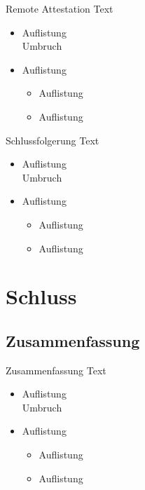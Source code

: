 \documentclass{sdqbeamer}
\begin{document}
\begin{frame}{Remote Attestation}
	Text
	\begin{itemize}
		\item Auflistung\\ Umbruch
		\item Auflistung
		\begin{itemize}
			\item Auflistung
			\item Auflistung
		\end{itemize}
	\end{itemize}
\end{frame}

\begin{frame}{Schlussfolgerung}
	Text
	\begin{itemize}
		\item Auflistung\\ Umbruch
		\item Auflistung
		\begin{itemize}
			\item Auflistung
			\item Auflistung
		\end{itemize}
	\end{itemize}
\end{frame}


\section{Schluss}
\subsection{Zusammenfassung}
\begin{frame}{Zusammenfassung}
	Text
	\begin{itemize}
		\item Auflistung\\ Umbruch
		\item Auflistung
		\begin{itemize}
			\item Auflistung
			\item Auflistung
		\end{itemize}
	\end{itemize}
\end{frame}
\end{document}
